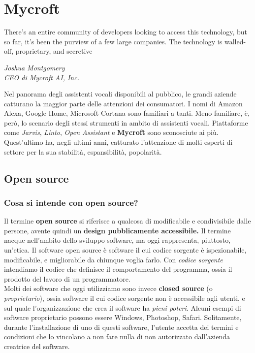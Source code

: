 \chapter{Mycroft}
\label{chap:mycroft}
\epigraph{There’s an entire community of developers looking to access this technology, but so far, it’s been the purview of a few large companies. The technology is walled-off, proprietary, and secretive}{\textit{Joshua Montgomery \\ CEO di Mycroft AI, Inc.}}
Nel panorama degli assistenti vocali disponibili al pubblico, le grandi aziende catturano la maggior parte delle attenzioni dei consumatori. I nomi di Amazon Alexa, Google Home, Microsoft Cortana sono familiari a tanti. Meno familiare, è, però, lo scenario degli stessi strumenti in ambito di assistenti vocali. Piattaforme come \textit{Jarvis}, \textit{Linto}, \textit{Open Assistant} e \textbf{Mycroft} sono sconosciute ai più. Quest'ultimo ha, negli ultimi anni, catturato l'attenzione di molti esperti di settore per la sua stabilità, espansibilità, popolarità.
\section{Open source}
\subsection{Cosa si intende con open source?}
Il termine \textbf{open source} si riferisce a qualcosa di modificabile e condivisibile dalle persone, avente quindi un \textbf{design pubblicamente accessibile.} Il termine nacque nell'ambito dello sviluppo software, ma oggi rappresenta, piuttosto, un'etica. Il software open source è software il cui codice sorgente è ispezionabile, modificabile, e migliorabile da chiunque voglia farlo. Con \textit{codice sorgente} intendiamo il codice che definisce il comportamento del programma, ossia il prodotto del lavoro di un programmatore. \\
Molti dei software che oggi utilizziamo sono invece \textbf{closed source} (o \textit{proprietario}), ossia software il cui codice sorgente non è accessibile agli utenti, e sul quale l'organizzazione che crea il software ha \textit{pieni poteri}. Alcuni esempi di software proprietario possono essere Windows, Photoshop, Safari. Solitamente, durante l'installazione di uno di questi software, l'utente accetta dei termini e condizioni che lo vincolano a non fare nulla di non autorizzato dall'azienda creatrice del software.

